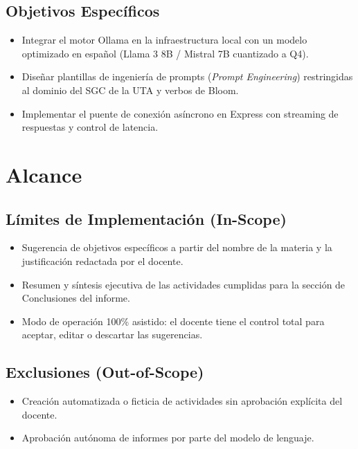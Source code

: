 \documentclass[12pt,a4paper]{article}
\begin{document}
\subsection{Objetivos Específicos}
\begin{itemize}[leftmargin=1.5em, itemsep=1.5pt]
    \item Integrar el motor Ollama en la infraestructura local con un modelo optimizado en español (Llama 3 8B / Mistral 7B cuantizado a Q4).
    \item Diseñar plantillas de ingeniería de prompts (\textit{Prompt Engineering}) restringidas al dominio del SGC de la UTA y verbos de Bloom.
    \item Implementar el puente de conexión asíncrono en Express con streaming de respuestas y control de latencia.
\end{itemize}

\section{Alcance}

\subsection{Límites de Implementación (In-Scope)}
\begin{itemize}[leftmargin=1.5em, itemsep=1.5pt]
    \item Sugerencia de objetivos específicos a partir del nombre de la materia y la justificación redactada por el docente.
    \item Resumen y síntesis ejecutiva de las actividades cumplidas para la sección de Conclusiones del informe.
    \item Modo de operación 100\% asistido: el docente tiene el control total para aceptar, editar o descartar las sugerencias.
\end{itemize}

\subsection{Exclusiones (Out-of-Scope)}
\begin{itemize}[leftmargin=1.5em, itemsep=1.5pt]
    \item Creación automatizada o ficticia de actividades sin aprobación explícita del docente.
    \item Aprobación autónoma de informes por parte del modelo de lenguaje.
\end{itemize}
\end{document}
